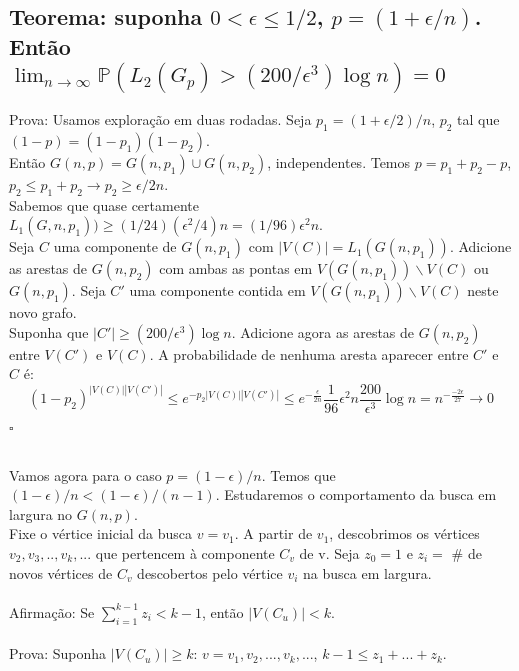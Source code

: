 \documentclass[a4paper,12pt]{article}
\begin{document}
\subsection{Teorema: suponha $0<\epsilon\leq1/2$, $p=(1+\epsilon/n)$. Então $\lim_{n\to\infty} \mathbb{P}(L_2(G_p)>(200/\epsilon^3)\log n)=0$}

Prova: Usamos exploração em duas rodadas. Seja $p_1 = (1+\epsilon/2)/n$, $p_2$ tal que $(1-p)=(1-p_1)(1-p_2)$.\\
Então $G(n,p)=G(n,p_1)\cup G(n,p_2)$, independentes. Temos $p=p_1+p_2-p$, $p_2\leq p_1+p_2\rightarrow p_2\geq\epsilon/2n$.\\

Sabemos que quase certamente $L_1(G,n,p_1))\geq(1/24)(\epsilon^2/4)n = (1/96)\epsilon^2n$.\\

Seja $C$ uma componente de $G(n,p_1)$ com $|V(C)|=L_1(G(n,p_1))$. Adicione as arestas de $G(n,p_2)$ com ambas as pontas em $V(G(n,p_1))\backslash V(C)$ ou $G(n,p_1)$. Seja $C'$ uma componente contida em $V(G(n,p_1))\backslash V(C)$ neste novo grafo.\\
Suponha que $|C'|\geq (200/\epsilon^3)\log n$. Adicione agora as arestas de $G(n,p_2)$ entre $V(C')$ e $V(C)$. A probabilidade de nenhuma aresta aparecer entre $C'$ e $C$ é:\\

\[(1-p_2)^{|V(C)||V(C')|}\leq e^{-p_2|V(C)||V(C')|}\leq  e^{-\frac{\epsilon}{2n}}\frac{1}{96}\epsilon^2 n \frac{200}{\epsilon^3}\log n=n^{-\frac{-2\epsilon}{27}}\rightarrow 0  \]

\begin{flushright}
$\square$
\end{flushright}\\

Vamos agora para o caso $p=(1-\epsilon)/n$. Temos que $(1-\epsilon)/n<(1-\epsilon)/(n-1)$.
Estudaremos o comportamento da busca em largura no $G(n,p)$.\\
Fixe o vértice inicial da busca $v=v_1$. A partir de $v_1$, descobrimos os vértices $v_2,v_3,..,v_k,...$ que pertencem à componente $C_v$ de v. Seja $z_0=1$ e $z_i =$ # de novos vértices de $C_v$ descobertos pelo vértice $v_i$ na busca em largura.\\
\\
Afirmação: Se $\sum_{i=1}^{k-1}z_i<k-1$, então $|V(C_u)|<k$.\\
\\
Prova: Suponha $|V(C_u)|\geq k$: $v=v_1,v_2,...,v_k,...$, $k-1\leq z_1+...+z_k$.\\
\end{document}
